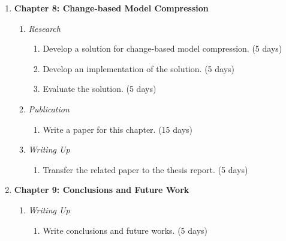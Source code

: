 \documentclass[12pt, a4paper]{report} \usepackage[titletoc]{appendix}
\begin{document}
\begin{enumerate}
\begin{enumerate}
    \end{enumerate}
    \item \textbf{Chapter 8: Change-based Model Compression}
    \begin{enumerate}
        \item \textit{Research}
        \begin{enumerate}
            \item Develop a solution for change-based model compression. (5 days)
            \item Develop an implementation of the solution. (5 days)
            \item Evaluate the solution. (5 days)
        \end{enumerate}
        \item \textit{Publication}
        \begin{enumerate}
            \item Write a paper for this chapter. (15 days)
        \end{enumerate}
        \item \textit{Writing Up}
        \begin{enumerate}
            \item Transfer the related paper to the thesis report. (5 days)
        \end{enumerate}
    \end{enumerate}
    \item \textbf{Chapter 9: Conclusions and Future Work}
    \begin{enumerate}
        \item \textit{Writing Up}
        \begin{enumerate}
            \item Write conclusions and future works. (5 days)
        \end{enumerate}
    \end{enumerate}
\end{enumerate}
\end{document}
